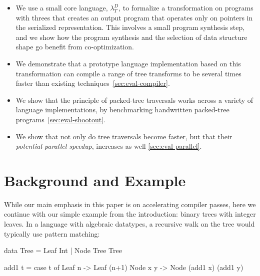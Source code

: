 \documentclass[preprint,10pt,nocopyrightspace,nonatbib]{./bibs/sigplanconf}
\newif\ifcurly
\begin{document}
\newcommand{\calculus}{$\lambda^D_T$} %

\begin{itemize}
\item We use a small core language, \calculus{}, to formalize a transformation
  on programs with threes that creates an output program that operates only on
  pointers in the serialized representation.  This involves a small program
  synthesis step, and we show how the program synthesis and the selection of
  data structure shape go benefit from co-optimization.
  
\item We demonstrate that a prototype language implementation based on this
  transformation can compile a range of tree transforms to be several times
  faster than existing techniques~\cref{sec:eval-compiler}.
  
\item We show that the principle of packed-tree traversals works across a
  variety of language implementations, by benchmarking handwritten packed-tree
  programs~\cref{sec:eval-shootout}.
  
\item We show that not only do tree traversals become faster, but that their
  {\em potential parallel speedup}, increases as well \cref{sec:eval-parallel}.
\end{itemize}


\section{Background and Example}

While our main emphasis in this paper is on accelerating compiler passes, here
we continue with our simple example from the introduction: binary trees with
integer leaves.
In a language with algebraic datatypes,
a recursive walk on
the tree would typically use pattern matching:

\ifcurly
\begin{code}[language=c]
type Tree = Leaf(Int) | Node(Tree,Tree);

fun add1(t) {
  match(t) {
    Leaf(n):   return Leaf(n+1);
    Node(x,y): return Node(add1(x),add1(y));
  }}
\end{code}
\else
\begin{code}
 data Tree = Leaf Int | Node Tree Tree
  
 add1 t =
  case t of
    Leaf n   -> Leaf (n+1)
    Node x y -> Node (add1 x) (add1 y)
\end{code}
\fi
\end{document}
